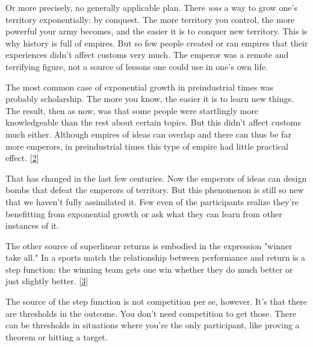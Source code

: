 Or more
                  precisely, no generally applicable plan. There \emph{was} a
                  way to grow one's territory exponentially: by conquest. The
                  more territory you control, the more powerful your army
                  becomes, and the easier it is to conquer new territory. This
                  is why history is full of empires. But so few people created
                  or ran empires that their experiences didn't affect customs
                  very much. The emperor was a remote and terrifying figure, not
                  a source of lessons one could use in one's own life.

The
                  most common case of exponential growth in preindustrial times
                  was probably scholarship. The more you know, the easier it is
                  to learn new things. The result, then as now, was that some
                  people were startlingly more knowledgeable than the rest about
                  certain topics. But this didn't affect customs much either.
                  Although empires of ideas can overlap and there can thus be
                  far more emperors, in preindustrial times this type of empire
                  had little practical effect.
                  [\href{\#f2n}{2}]

That has changed in the last few centuries. Now
                  the emperors of ideas can design bombs that defeat the
                  emperors of territory. But this phenomenon is still so new
                  that we haven't fully assimilated it. Few even of the
                  participants realize they're benefitting from exponential
                  growth or ask what they can learn from other instances of
                  it.

The other source of superlinear returns is
                  embodied in the expression "winner take all." In a sports
                  match the relationship between performance and return is a
                  step function: the winning team gets one win whether they do
                  much better or just slightly better.
                  [\href{\#f3n}{3}]

The source of the step function is not
                  competition per se, however. It's that there are thresholds in
                  the outcome. You don't need competition to get those. There
                  can be thresholds in situations where you're the only
                  participant, like proving a theorem or hitting a target.

